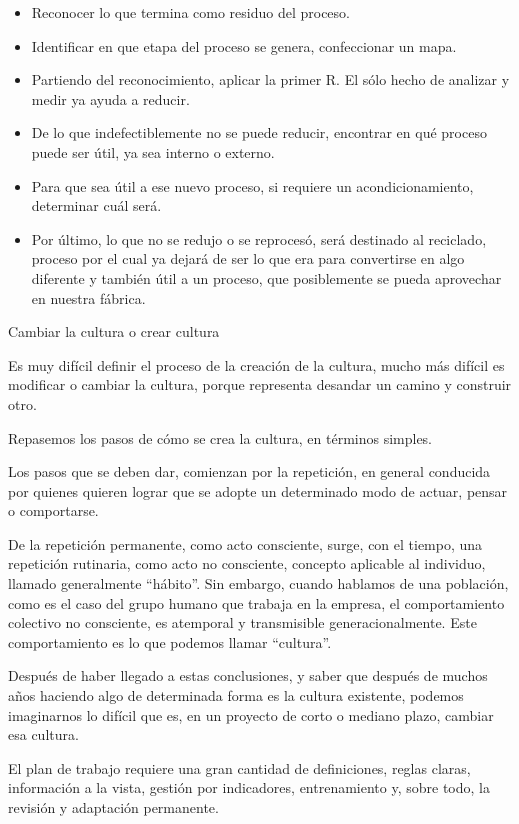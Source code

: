 \begin{fullwidth}
\begin{itemize}
\item
  Reconocer lo que termina como residuo del proceso.
\item
  Identificar en que etapa del proceso se genera, confeccionar un mapa.
\item
  Partiendo del reconocimiento, aplicar la primer R. El sólo hecho de
  analizar y medir ya ayuda a reducir.
\item
  De lo que indefectiblemente no se puede reducir, encontrar en qué
  proceso puede ser útil, ya sea interno o externo.
\item
  Para que sea útil a ese nuevo proceso, si requiere un
  acondicionamiento, determinar cuál será.
\item
  Por último, lo que no se redujo o se reprocesó, será destinado al
  reciclado, proceso por el cual ya dejará de ser lo que era para
  convertirse en algo diferente y también útil a un proceso, que
  posiblemente se pueda aprovechar en nuestra fábrica.
\end{itemize}

Cambiar la cultura o crear cultura

Es muy difícil definir el proceso de la creación de la cultura, mucho
más difícil es modificar o cambiar la cultura, porque representa
desandar un camino y construir otro.

Repasemos los pasos de cómo se crea la cultura, en términos simples.

Los pasos que se deben dar, comienzan por la repetición, en general
conducida por quienes quieren lograr que se adopte un determinado modo
de actuar, pensar o comportarse.

De la repetición permanente, como acto consciente, surge, con el tiempo,
una repetición rutinaria, como acto no consciente, concepto aplicable al
individuo, llamado generalmente ``hábito''. Sin embargo, cuando hablamos
de una población, como es el caso del grupo humano que trabaja en la
empresa, el comportamiento colectivo no consciente, es atemporal y
transmisible generacionalmente. Este comportamiento es lo que podemos
llamar ``cultura''.

Después de haber llegado a estas conclusiones, y saber que después de
muchos años haciendo algo de determinada forma es la cultura existente,
podemos imaginarnos lo difícil que es, en un proyecto de corto o mediano
plazo, cambiar esa cultura.

El plan de trabajo requiere una gran cantidad de definiciones, reglas
claras, información a la vista, gestión por indicadores, entrenamiento
y, sobre todo, la revisión y adaptación permanente.


\end{fullwidth}
